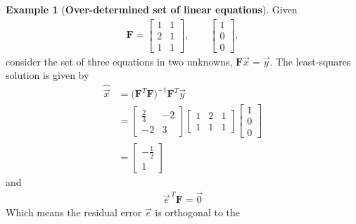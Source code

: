\documentclass[11pt,a4paper,oneside]{book}
\numberwithin{equation}{section}
\theoremstyle{it}
\theoremstyle{definition}
\newtheorem{example}{Example}[chapter]
\begin{document}
\begin{example}[\textbf{Over-determined set of linear equations}]
	Given
	\begin{equation*}
		\begin{aligned}
			\mathbf{F} = \begin{bmatrix} 1&1\\2&1\\1&1 \end{bmatrix}, \qquad 
			\begin{bmatrix} 1\\0\\0 \end{bmatrix},
		\end{aligned}
	\end{equation*}
	consider the set of three equations in two unknowns, 
	$\mathbf{F}\vec{x}=\vec{y}$. The least-squares solution is given by
	\begin{equation*}
		\begin{aligned}
			\hat{\vec{x}} &= 
			\Big(\mathbf{F}^T\mathbf{F}\Big)^{-1}\mathbf{F}^T\vec{y} \\[6pt]
			&= \begin{bmatrix} \frac{2}{3} & -2 \\-2 & 3 \end{bmatrix} 
			\begin{bmatrix} 1 & 2 & 1 \\1 & 1 & 1 \end{bmatrix} \begin{bmatrix} 
			1\\ 0\\ 0 \end{bmatrix} \\[6pt]
			&= \begin{bmatrix} -\frac{1}{2}\\ 1 \end{bmatrix}
		\end{aligned}
	\end{equation*}
	and 
	\begin{equation*}
		\begin{aligned}
			\vec{e}^{\,T}\mathbf{F} = \vec{0} 
		\end{aligned}
	\end{equation*}
	Which means the residual error $\vec{e}$ is orthogonal to the 

\end{example}
\end{document}
